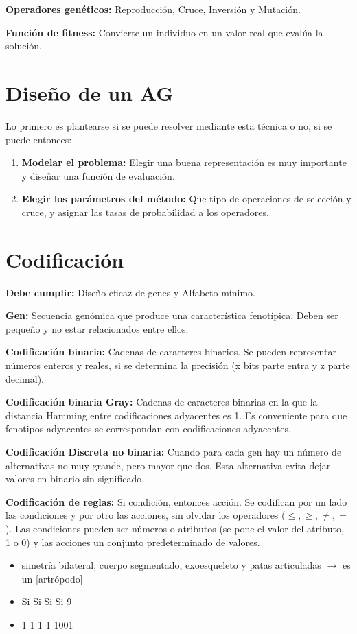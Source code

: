 \documentclass[12pt, twoside, openright]{report} %
\begin{document}
\textbf{Operadores genéticos:} Reproducción, Cruce, Inversión y Mutación.

\textbf{Función de fitness:} Convierte un individuo en un valor real que evalúa la solución.

\section{Diseño de un AG}
Lo primero es plantearse si se puede resolver mediante esta técnica o no, si se puede entonces:
\begin{enumerate}
	\item \textbf{Modelar el problema:} Elegir una buena representación es muy importante y diseñar una función de evaluación.
	\item \textbf{Elegir los parámetros del método:} Que tipo de operaciones de selección y cruce, y asignar las tasas de probabilidad a los operadores.
\end{enumerate}

\section{Codificación}
\textbf{Debe cumplir:} Diseño eficaz de genes y Alfabeto mínimo.

\textbf{Gen:} Secuencia genómica que produce una característica fenotípica. Deben ser pequeño y no estar relacionados entre ellos.

\textbf{Codificación binaria:} Cadenas de caracteres binarios. Se pueden representar números enteros y reales, si se determina la precisión (x bits parte entra y z parte decimal).

\textbf{Codificación binaria Gray:} Cadenas de caracteres binarias en la que la distancia Hamming entre codificaciones adyacentes es 1. Es conveniente para que fenotipos adyacentes se correspondan con codificaciones adyacentes.

\textbf{Codificación Discreta no binaria:} Cuando para cada gen hay un número de alternativas no muy grande, pero mayor que dos. Esta alternativa evita dejar valores en binario sin significado.

\textbf{Codificación de reglas:} Si condición, entonces acción. Se codifican por un lado las condiciones y por otro las acciones, sin olvidar los operadores ($\le, \ge, \neq, =$). Las condiciones pueden ser números o atributos (se pone el valor del atributo, 1 o 0) y las acciones un conjunto predeterminado de valores.
\begin{itemize}
	\item simetría bilateral, cuerpo segmentado, exoesqueleto y patas articuladas $\rightarrow$ es un [artrópodo]
	\item Si Si Si Si 9
	\item 1 1 1 1 1001
\end{itemize}
\end{document}
